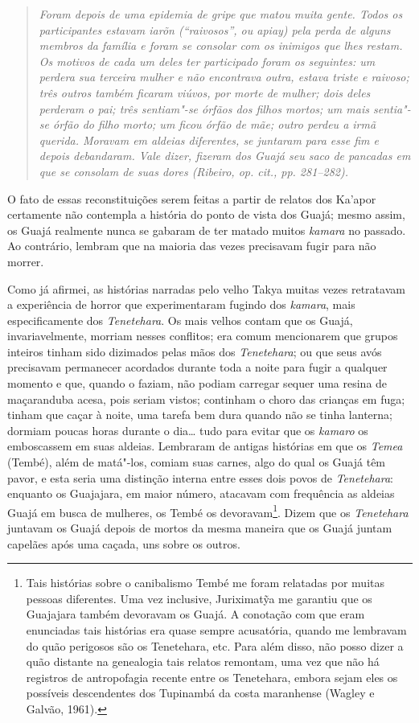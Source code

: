 \begin{quote}
\emph{Foram depois de uma epidemia de gripe que matou muita gente. Todos os
participantes estavam \emph{iarõn} (``raivosos'', ou \emph{apiay}) pela
perda de alguns membros da família e foram se consolar com os inimigos
que lhes restam. Os motivos de cada um deles ter participado foram os
seguintes: um perdera sua terceira mulher e não encontrava outra, estava
triste e raivoso; três outros também ficaram viúvos, por morte de
mulher; dois deles perderam o pai; três sentiam"-se órfãos dos filhos
mortos; um mais sentia"-se órfão do filho morto; um ficou órfão de mãe;
outro perdeu a irmã querida. Moravam em aldeias diferentes, se juntaram
para esse fim e depois debandaram. Vale dizer, fizeram dos Guajá seu
saco de pancadas em que se consolam de suas dores (Ribeiro, \emph{op. cit.},
pp. 281--282).}
\end{quote}

O fato de essas reconstituições serem feitas a partir de relatos dos
Ka'apor certamente não contempla a história do ponto de vista dos Guajá;
mesmo assim, os Guajá realmente nunca se gabaram de ter matado muitos
\emph{kamara} no passado. Ao contrário, lembram que na maioria das vezes
precisavam fugir para não morrer.

Como já afirmei, as histórias narradas pelo velho Takya muitas vezes
retratavam a experiência de horror que experimentaram fugindo dos
\emph{kamara}, mais especificamente dos \emph{Tenetehara}. Os mais
velhos contam que os Guajá, invariavelmente, morriam nesses conflitos;
era comum mencionarem que grupos inteiros tinham sido dizimados pelas
mãos dos \emph{Tenetehara}; ou que seus avós precisavam permanecer
acordados durante toda a noite para fugir a qualquer momento e que,
quando o faziam, não podiam carregar sequer uma resina de maçaranduba
acesa, pois seriam vistos; continham o choro das crianças em fuga;
tinham que caçar à noite, uma tarefa bem dura quando não se tinha
lanterna; dormiam poucas horas durante o dia\ldots{} tudo para evitar que os
\emph{kamaro} os emboscassem em suas aldeias. Lembraram de antigas
histórias em que os \emph{Temea} (Tembé), além de matá"-los, comiam suas
carnes, algo do qual os Guajá têm pavor, e esta seria uma distinção
interna entre esses dois povos de \emph{Tenetehara}: enquanto os
Guajajara, em maior número, atacavam com frequência as aldeias Guajá em
busca de mulheres, os Tembé os devoravam\footnote{Tais histórias sobre o
  canibalismo Tembé me foram relatadas por muitas pessoas diferentes.
  Uma vez inclusive, Juriximatỹa me garantiu que os Guajajara também
  devoravam os Guajá. A conotação com que eram enunciadas tais histórias
  era quase sempre acusatória, quando me lembravam do quão perigosos são
  os Tenetehara, etc. Para além disso, não posso dizer a quão distante
  na genealogia tais relatos remontam, uma vez que não há registros de
  antropofagia recente entre os Tenetehara, embora sejam eles os
  possíveis descendentes dos Tupinambá da costa maranhense (Wagley e
  Galvão, 1961).}. Dizem que os \emph{Tenetehara} juntavam os Guajá
depois de mortos da mesma maneira que os Guajá juntam capelães após uma
caçada, uns sobre os outros.

